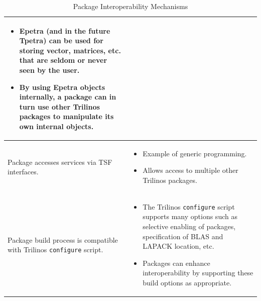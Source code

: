 \documentclass[12pt,relax]{TPA}
\begin{document}
\begin{table}
\begin{center}
\begin{tabular}{|p{1.75in}|p{2.75in}|}
\begin{itemize}
\item Epetra (and in the future Tpetra) can be used for storing
vector, matrices, etc. that are seldom or
never seen by the user.  
\item  By using Epetra objects
internally, a package can in turn use other Trilinos packages to
manipulate its own internal objects.
\end{itemize}\\\hline
Package accesses services via TSF interfaces.&
\begin{itemize}
\item Example of generic programming.
\item Allows access to multiple other Trilinos packages.
\end{itemize}\\\hline
Package build process is compatible with Trilinos {\tt configure} script. &
\begin{itemize}
\item The Trilinos {\tt configure} script supports many options such
as selective enabling of packages, specification of BLAS and LAPACK
location, etc.
\item Packages can enhance interoperability by supporting these build
options as appropriate.
\end{itemize}\\\hline
\end{tabular}
\caption{\label{Table:Mechanisms} Package Interoperability Mechanisms}
\end{center}
\end{table}
\end{document}
